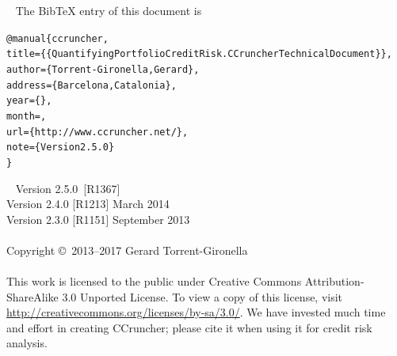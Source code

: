 \documentclass[11pt,fleqn]{book} %
\def\numversion{2.5.0}
\def\svnversion{R1367}
\begin{document}

~\vfill
The BibTeX entry of this document is
\begin{alltt}
@manual\{ccruncher,
    title = \{\{Quantifying Portfolio Credit Risk. CCruncher Technical Document\}\},
    author = \{Torrent-Gironella, Gerard\},
    address = \{Barcelona, Catalonia\},
    year = \{\the\year\}, 
    month = \shortmonthname,
    url = \{http://www.ccruncher.net/\},
    note = \{Version \numversion\}
\}
\end{alltt}

~\vfill
\thispagestyle{empty}
\noindent Version \numversion\ [\svnversion] \monthname\ \the\year\\ 
\noindent Version 2.4.0 [R1213] March 2014\\ 
\noindent Version 2.3.0 [R1151] September 2013\\ 
\\
\noindent Copyright \copyright\ 2013--2017 Gerard Torrent-Gironella\\
\\
\noindent 
This work is licensed to the public under Creative Commons 
Attribution-ShareAlike 3.0 Unported License. To view a copy 
of this license, visit 
\url{http://creativecommons.org/licenses/by-sa/3.0/}.
We have invested much time and effort in creating CCruncher; 
please cite it when using it for credit risk analysis.


\pagestyle{empty}
\setcounter{tocdepth}{1}
\tableofcontents
\end{document}
